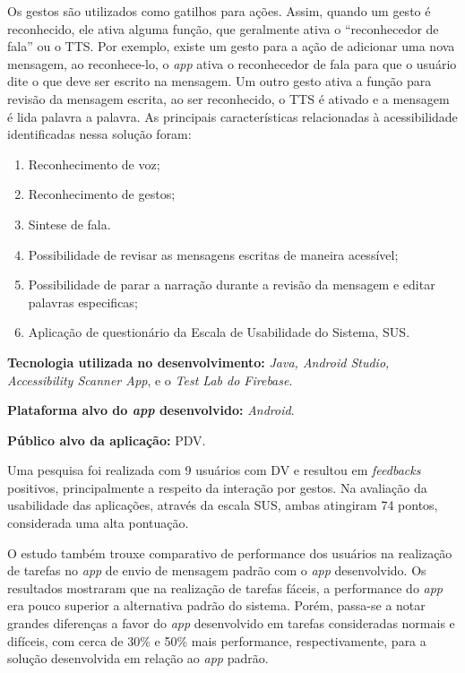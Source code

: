 Os gestos são utilizados como gatilhos para ações.
Assim, quando um gesto é reconhecido, ele ativa alguma função, que geralmente ativa o ``reconhecedor de fala'' ou o TTS\@.
Por exemplo, existe um gesto para a ação de adicionar uma nova mensagem, ao reconhece-lo, o \emph{app} ativa o reconhecedor de fala para que o usuário dite o que deve ser escrito na mensagem.
Um outro gesto ativa a função para revisão da mensagem escrita, ao ser reconhecido, o TTS é ativado e a mensagem é lida palavra a palavra.
As principais características relacionadas à acessibilidade identificadas nessa solução foram:

\begin{enumerate}
    \item Reconhecimento de voz;
    \item Reconhecimento de gestos;
    \item Sintese de fala.
    \item Possibilidade de revisar as mensagens escritas de maneira acessível;
    \item Possibilidade de parar a narração durante a revisão da mensagem e editar palavras especificas;
    \item Aplicação de questionário da Escala de Usabilidade do Sistema, SUS\@.
\end{enumerate}

\textbf{Tecnologia utilizada no desenvolvimento:} \emph{Java, Android Studio, Accessibility Scanner App}, e o \emph{Test Lab do Firebase}.

\textbf{Plataforma alvo do \emph{app} desenvolvido:} \emph{Android}.

\textbf{Público alvo da aplicação:} PDV\@.

Uma pesquisa foi realizada com 9 usuários com DV e resultou em \emph{feedbacks} positivos, principalmente a respeito da interação por gestos.
Na avaliação da usabilidade das aplicações, através da escala SUS, ambas atingiram 74 pontos, considerada uma alta pontuação.

O estudo também trouxe comparativo de performance dos usuários na realização de tarefas no \emph{app} de envio de mensagem padrão com o \emph{app} desenvolvido.
Os resultados mostraram que na realização de tarefas fáceis, a performance do \emph{app} era pouco superior a alternativa padrão do sistema.
Porém, passa-se a notar grandes diferenças a favor do \emph{app} desenvolvido em tarefas consideradas normais e difíceis, com cerca de 30\% e 50\% mais performance, respectivamente, para a solução desenvolvida em relação ao \emph{app} padrão.

